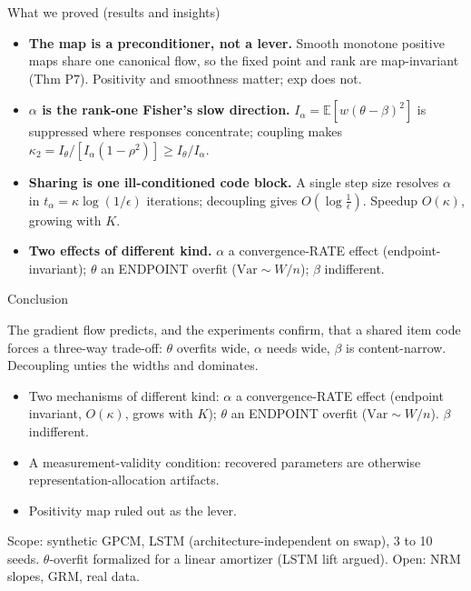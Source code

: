 \documentclass[aspectratio=169]{beamer}
\begin{document}
\begin{frame}{What we proved (results and insights)}
\footnotesize
\begin{itemize}
\item \textbf{The map is a preconditioner, not a lever.} Smooth monotone positive maps share one canonical flow, so the fixed point and rank are map-invariant (Thm P7). Positivity and smoothness matter; exp does not.
\item \textbf{$\alpha$ is the rank-one Fisher's slow direction.} $I_\alpha=\mathbb{E}[w(\theta-\beta)^2]$ is suppressed where responses concentrate; coupling makes $\kappa_2=I_\theta/[I_\alpha(1-\rho^2)]\ge I_\theta/I_\alpha$.
\item \textbf{Sharing is one ill-conditioned code block.} A single step size resolves $\alpha$ in $t_\alpha=\kappa\log(1/\epsilon)$ iterations; decoupling gives $O(\log\tfrac1\epsilon)$. Speedup $O(\kappa)$, growing with $K$.
\item \textbf{Two effects of different kind.} $\alpha$ a convergence-RATE effect (endpoint-invariant); $\theta$ an ENDPOINT overfit ($\mathrm{Var}\sim W/n$); $\beta$ indifferent.
\end{itemize}
\end{frame}

\begin{frame}{Conclusion}
\begin{block}{}
The gradient flow predicts, and the experiments confirm, that a shared item code
forces a three-way trade-off: $\theta$ overfits wide, $\alpha$ needs wide, $\beta$
is content-narrow. Decoupling unties the widths and dominates.
\end{block}
\medskip
\begin{itemize}\small
\item Two mechanisms of different kind: $\alpha$ a convergence-RATE effect (endpoint invariant, $O(\kappa)$, grows with $K$); $\theta$ an ENDPOINT overfit ($\mathrm{Var}\sim W/n$). $\beta$ indifferent.
\item A measurement-validity condition: recovered parameters are otherwise representation-allocation artifacts.
\item Positivity map ruled out as the lever.
\end{itemize}
\medskip
\footnotesize Scope: synthetic GPCM, LSTM (architecture-independent on swap), 3 to 10 seeds.
$\theta$-overfit formalized for a linear amortizer (LSTM lift argued). Open: NRM slopes, GRM, real data.
\end{frame}
\end{document}

